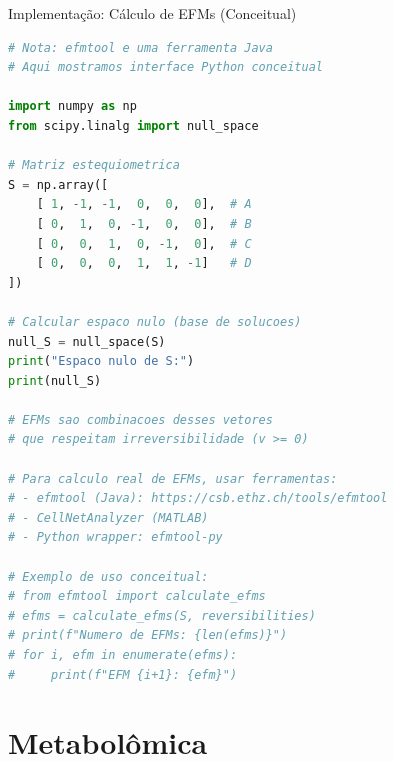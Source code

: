 \begin{frame}[fragile]{Implementação: Cálculo de EFMs (Conceitual)}
\begin{lstlisting}[language=Python, caption=EFMs com efmtool (interface conceitual), basicstyle=\ttfamily\footnotesize]
# Nota: efmtool e uma ferramenta Java
# Aqui mostramos interface Python conceitual

import numpy as np
from scipy.linalg import null_space

# Matriz estequiometrica
S = np.array([
    [ 1, -1, -1,  0,  0,  0],  # A
    [ 0,  1,  0, -1,  0,  0],  # B
    [ 0,  0,  1,  0, -1,  0],  # C
    [ 0,  0,  0,  1,  1, -1]   # D
])

# Calcular espaco nulo (base de solucoes)
null_S = null_space(S)
print("Espaco nulo de S:")
print(null_S)

# EFMs sao combinacoes desses vetores
# que respeitam irreversibilidade (v >= 0)

# Para calculo real de EFMs, usar ferramentas:
# - efmtool (Java): https://csb.ethz.ch/tools/efmtool
# - CellNetAnalyzer (MATLAB)
# - Python wrapper: efmtool-py

# Exemplo de uso conceitual:
# from efmtool import calculate_efms
# efms = calculate_efms(S, reversibilities)
# print(f"Numero de EFMs: {len(efms)}")
# for i, efm in enumerate(efms):
#     print(f"EFM {i+1}: {efm}")
\end{lstlisting}
\end{frame}

\section{Metabolômica}


